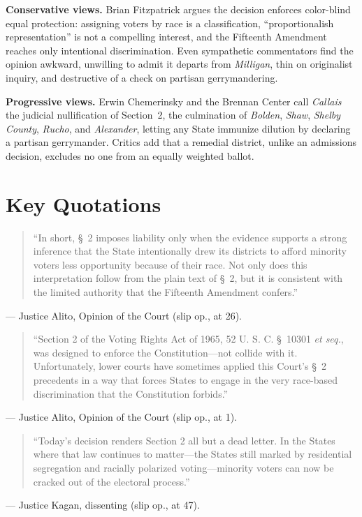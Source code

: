 \documentclass[12pt]{article}
\begin{document}
\textbf{Conservative views.} Brian Fitzpatrick argues the decision enforces color-blind equal protection: assigning voters by race is a classification, ``proportionalish representation'' is not a compelling interest, and the Fifteenth Amendment reaches only intentional discrimination. Even sympathetic commentators find the opinion awkward, unwilling to admit it departs from \textit{Milligan}, thin on originalist inquiry, and destructive of a check on partisan gerrymandering.

\textbf{Progressive views.} Erwin Chemerinsky and the Brennan Center call \textit{Callais} the judicial nullification of Section~2, the culmination of \textit{Bolden}, \textit{Shaw}, \textit{Shelby County}, \textit{Rucho}, and \textit{Alexander}, letting any State immunize dilution by declaring a partisan gerrymander. Critics add that a remedial district, unlike an admissions decision, excludes no one from an equally weighted ballot.

\section{Key Quotations}

\begin{quote}
``In short, \S~2 imposes liability only when the evidence supports a strong inference that the State intentionally drew its districts to afford minority voters less opportunity because of their race. Not only does this interpretation follow from the plain text of \S~2, but it is consistent with the limited authority that the Fifteenth Amendment confers.''
\end{quote}
\noindent --- Justice Alito, Opinion of the Court (slip op., at 26).

\begin{quote}
``Section 2 of the Voting Rights Act of 1965, 52 U. S. C. \S~10301 \textit{et seq.}, was designed to enforce the Constitution---not collide with it. Unfortunately, lower courts have sometimes applied this Court's \S~2 precedents in a way that forces States to engage in the very race-based discrimination that the Constitution forbids.''
\end{quote}
\noindent --- Justice Alito, Opinion of the Court (slip op., at 1).

\begin{quote}
``Today's decision renders Section 2 all but a dead letter. In the States where that law continues to matter---the States still marked by residential segregation and racially polarized voting---minority voters can now be cracked out of the electoral process.''
\end{quote}
\noindent --- Justice Kagan, dissenting (slip op., at 47).
\end{document}
